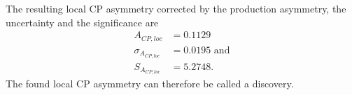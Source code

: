 The resulting local CP asymmetry
corrected by the production asymmetry, the uncertainty and the significance are
\begin{align*}
  A_{CP,loc} &= 0.1129\\
  \sigma_{A_{CP,loc}} &= 0.0195 \, \, \mathrm{and}\\
  S_{A_{CP,loc}} &= 5.2748.
\end{align*}
The found local CP asymmetry can therefore be called a discovery.
